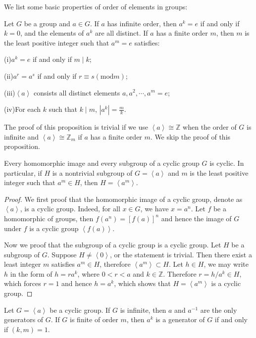 We list some basic properties of order of elements in groups:
\begin{proposition}
Let $G$ be a group and $a\in G$. If $a$ has infinite order, then $a^k=e$ if and only if $k=0$, and the elements of $a^k$ are all distinct. If $a$ has a finite order $m$, then $m$ is the least positive integer such that $a^m=e$ satisfies:\par
(i)$a^k=e$ if and only if $m\mid k$;\par
(ii)$a^r=a^s$ if and only if $r\equiv s(\mathrm{mod} m)$;\par
(iii)$\left<a\right>$ consists all distinct elements $a,a^2,\cdots,a^m=e$;\par
(iv)For each $k$ such that $k\mid m$, $|a^k|=\frac{m}{k}$.
\end{proposition}
The proof of this proposition is trivial if we use $\left<a\right>\cong\mathbb{Z}$ when the order of $G$ is infinite and $\left<a\right>\cong\mathbb{Z}_m$ if $a$ has a finite order $m$. We skip the proof of this proposition.\par
\begin{theorem}
Every homomorphic image and every subgroup of a cyclic group $G$ is cyclic. In particular, if $H$ is a nontrivial subgroup of $G=\left<a\right>$ and $m$ is the least positive integer such that $a^m\in H$, then $H=\left<a^m\right>$.
\end{theorem}
\begin{proof}
We first proof that the homomorphic image of a cyclic group, denote as $\left<a\right>$, is a cyclic group. Indeed, for all $x\in G$, we have $x=a^n$. Let $f$ be a homomorphic of groups, then $f(a^n)=[f(a)]^n$ and hence the image of $G$ under $f$ is a cyclic group $\left<f(a)\right>$.\par
Now we proof that the subgroup of a cyclic group is a cyclic group. Let $H$ be a subgroup of $G$. Suppose $H\ne\left<0\right>$, or the statement is trivial. Then there exist a least integer $m$ satisfies $a^m\in H$, therefore $\left<a^m\right>\subset H$. Let $h\in H$, we may write $h$ in the form of $h=ra^k$, where $0<r<a$ and $k\in\mathbb{Z}$. Therefore $r=h/a^k\in H$, which forces $r=1$ and hence $h=a^k$, which shows that $H=\left<a^m\right>$ is a cyclic group.
\end{proof}
\begin{theorem}
Let $G=\left<a\right>$ be a cyclic group. If $G$ is infinite, then $a$ and $a^{-1}$ are the only generators of $G$. If $G$ is finite of order $m$, then $a^k$ is a generator of $G$ if and only if $(k,m)=1$. 
\end{theorem}
